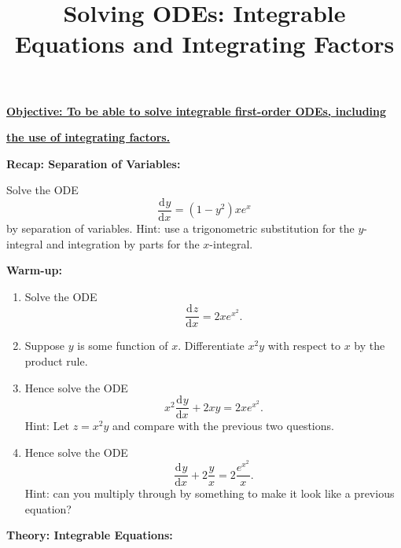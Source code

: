 \documentclass{article}
\newcommand{\deriv}[3][]{\frac{\mathrm{d}^{#1}#2}{\mathrm{d}#3^{#1}}}
\begin{document}
\title{Solving ODEs: Integrable Equations and Integrating Factors}
\date{}

\maketitle
\thispagestyle{empty}

\Large

\textbf{\underline{Objective: To be able to solve integrable first-order ODEs, including}}

\textbf{\underline{the use of integrating factors.}}







\vspace{5mm}



\textbf{Recap: Separation of Variables:}\bigskip

Solve the ODE
\[\deriv{y}{x}=\left(1-y^2\right)xe^x\]
by separation of variables. Hint: use a trigonometric substitution for the $y$-integral and integration by parts for the $x$-integral.






\clearpage



\textbf{Warm-up:}\bigskip


\begin{enumerate}
	\item Solve the ODE
		\[\deriv{z}{x}=2xe^{x^2}.\]
	\item Suppose $y$ is some function of $x$. Differentiate $x^2y$ with respect to $x$ by the product rule.
	\item Hence solve the ODE
		\[x^2\deriv{y}{x}+2xy=2xe^{x^2}.\]
		Hint: Let $z=x^2y$ and compare with the previous two questions.
	\item Hence solve the ODE
		\[\deriv{y}{x}+2\frac{y}{x}=2\frac{e^{x^2}}{x}.\]
		Hint: can you multiply through by something to make it look like a previous equation?
\end{enumerate}





\clearpage










\textbf{Theory: Integrable Equations:}
\end{document}
